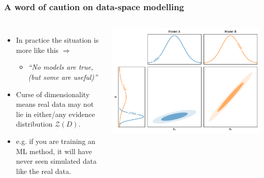 \documentclass[aspectratio=169]{beamer}
\begin{document}
\begin{frame}
    \frametitle{A word of caution on data-space modelling}
    \begin{columns}
        \begin{itemize}
            \item In practice the situation is more like this $\Rightarrow$
                \begin{itemize}
                    \item \emph{``No models are true,} \\\emph{(but some are useful)''}
                \end{itemize}
            \item Curse of dimensionality means real data may not lie in either/any evidence distribution $\mathcal{Z}(D)$.
            \item e.g. if you are training an ML method, it will have never seen simulated data like the real data.
        \end{itemize}
        
        \includegraphics[page=5, width=\textwidth]{figures/sbi_model_comparison.pdf}%
    \end{columns}
\end{frame}
\end{document}
